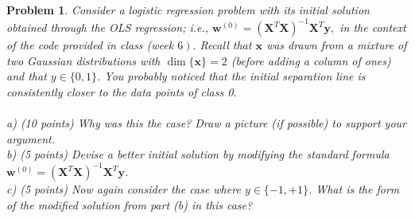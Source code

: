 \documentclass[10pt]{article}
\newtheorem{problem}{Problem}
\begin{document}
\begin{problem}
Consider a logistic regression problem with its initial solution obtained through the OLS regression; i.e., $\mathbf{w}^{(0)}=\left(\mathbf{X}^{T} \mathbf{X}\right)^{-1} \mathbf{X}^{T} \mathbf{y},$ in the context of the code provided in class (week $\left.6\right) .$ Recall that $\mathbf{x}$ was drawn from a mixture of two Gaussian distributions with $\operatorname{dim}\{\mathbf{x}\}=2$ (before adding a column of ones) and that $y \in\{0,1\}$. You probably noticed that the initial separation line is consistently closer to the data points of class 0.\\\\
a) (10 points) Why was this the case? Draw a picture (if possible) to support your argument.\\
b) (5 points) Devise a better initial solution by modifying the standard formula $\mathbf{w}^{(0)}=\left(\mathbf{X}^{T} \mathbf{X}\right)^{-1} \mathbf{X}^{T} \mathbf{y}$.\\
c) (5 points) Now again consider the case where $y \in\{-1,+1\}$. What is the form of the modified solution from part (b) in this case?
\end{problem}
\end{document}
